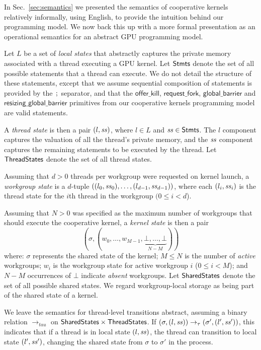 \documentclass[parskip=half,sigconf,review, anonymous=true, acmcopyrightmode=none]{acmart}
\newcommand{\mysec}{Sec.~}
\newcommand{\code}[1]{\lstset{basicstyle=\tt}\lstinline!#1!\lstset{basicstyle=\scriptsize\tt}}
\newcommand{\offerfork}{\mathsf{request\_fork}}
\newcommand{\offerkill}{\mathsf{offer\_kill}}
\newcommand{\globalbarrier}{\mathsf{global\_barrier}}
\newcommand{\resizingglobalbarrier}{\mathsf{resizing\_global\_barrier}}
\begin{document}
In \mysec\ref{sec:semantics} we presented the semantics of cooperative
kernels relatively informally, using English, to provide the intuition
behind our programming model.  We now back this up with a more formal
presentation as an operational semantics for an abstract GPU
programming model.

%
Let $L$ be a set of \emph{local states} that abstractly captures the
private memory associated with a thread executing a GPU kernel.  Let
$\mathsf{Stmts}$ denote the set of all possible statements that a
thread can execute.  We do not detail the structure of these
statements, except that we assume sequential composition of statements
is provided by the $\code{;}$ separator, and that the $\offerkill$,
$\offerfork$, $\globalbarrier$ and $\resizingglobalbarrier$ primitives
from our cooperative kernels programming model are valid statements.

A \emph{thread state} is then a pair $(l, \mathit{ss})$, where $l \in L$ and
$\mathit{ss} \in \mathsf{Stmts}$.  The $l$ component captures the valuation of all the
thread's private memory, and the $\mathit{ss}$ component captures the
remaining statements to be executed by the thread.  Let $\mathsf{ThreadStates}$ denote the set of all thread states.

Assuming that $d > 0$ threads per workgroup were requested on kernel launch, a \emph{workgroup state}
is a $d$-tuple $((l_0, \mathit{ss}_0), \dots, (l_{d-1}, \mathit{ss}_{d-1}))$, where each $(l_i, \mathit{ss}_i)$ is the thread state for the $i$th thread in the workgroup $(0\leq i < d$).

Assuming that $N > 0$ was specified as the maximum number of
workgroups that should execute the cooperative kernel, a \emph{kernel
  state} is then a pair
%
\[
(\sigma, (w_0, \dots, w_{M-1}, \underbrace{\bot, \dots,
\bot}_{N-M}))\]
%
where: $\sigma$ represents the shared state of the kernel; $M \leq N$
is the number of \emph{active} workgroups; $w_i$ is the workgroup
state for active workgroup $i$ ($0 \leq i < M$); and $N-M$ occurrences
of $\bot$ indicate \emph{absent} workgroups.  Let $\mathsf{SharedStates}$
denote the set of all possible shared states.  We regard
workgroup-local storage as being part of the shared state of a kernel.

%
We leave the semantics for thread-level transitions abstract, assuming
a binary relation $\rightarrow_{tau}$ on $\mathsf{SharedStates}{} \times
\mathsf{ThreadStates}{}$.  If $(\sigma, (l, \mathit{ss})) \rightarrow_{\tau}
(\sigma', (l', \mathit{ss}'))$, this indicates that if a thread is in local
state $(l, \mathit{ss})$, the thread can transition to local state $(l',
\mathit{ss}')$, changing the shared state from $\sigma$ to $\sigma'$ in the
process.
\end{document}
